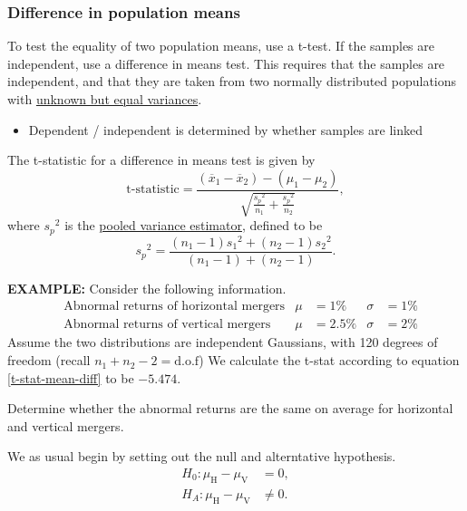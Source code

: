 \documentclass[../notes_compiled.tex]{subfiles}
\begin{document}
\subsubsection{Difference in population means}
\begin{itemize}
\item To test the equality of two population means, use a t-test. If the samples are independent, use a difference in means test. This requires that the samples are independent, and that they are taken from two normally distributed populations with \underline{unknown but equal variances}.
\begin{itemize}
\item[Note:] Dependent / independent is determined by whether samples are linked
\end{itemize}
The t-statistic for a difference in means test is given by
\begin{equation}
\text{t-statistic} = \frac{(\overline{x}_{1}-\overline{x}_{2})-(\mu_{1}-\mu_{2})}{\sqrt{\frac{{s_{p}}^{2}}{n_{1}}+\frac{{s_{p}}^{2}}{n_{2}}}}, \label{t-stat-mean-diff}
\end{equation}
where ${s_{p}}^{2}$ is the \underline{pooled variance estimator}, defined to be
\begin{equation}
{s_{p}}^{2} = \frac{(n_{1}-1){s_{1}}^{2}+(n_{2}-1){s_{2}}^{2}}{(n_{1}-1)+(n_{2}-1)}.
\end{equation}

{\color{RedViolet}
\item[] \textbf{EXAMPLE:} Consider the following information.
\begin{align*}
&\text{Abnormal returns of horizontal mergers} & \mu&=1\% & \sigma&=1\% \\
&\text{Abnormal returns of vertical mergers} & \mu&=2.5\% & \sigma&=2\%
\end{align*}
Assume the two distributions are independent Gaussians, with 120 degrees of freedom (recall $n_{1} + n_{2} -2 = \mathrm{d.o.f}$) We calculate the t-stat according to equation \ref{t-stat-mean-diff} to be $-5.474$. 

Determine whether the abnormal returns are the same on average for horizontal and vertical mergers.
}

{\color{RoyalBlue}
\item[] We as usual begin by setting out the null and alterntative hypothesis.
\begin{align*}
H_{0}: \mu_{\mathrm{H}} - \mu_{\mathrm{V}} & =0, \\
H_{A}: \mu_{\mathrm{H}} - \mu_{\mathrm{V}} & \neq 0.
\end{align*}

}
\end{itemize}
\end{document}

